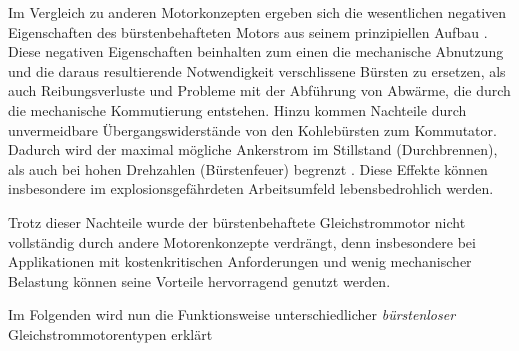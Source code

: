 \glqq{}Im  Vergleich  zu  anderen  Motorkonzepten  ergeben  sich  die  wesentlichen negativen Eigenschaften des bürstenbehafteten Motors aus seinem prinzipiellen Aufbau\grqq{} \parencite[S.52]{Probst2011}. Diese negativen Eigenschaften beinhalten zum einen die mechanische Abnutzung und die daraus resultierende Notwendigkeit verschlissene Bürsten zu ersetzen, als auch Reibungsverluste und Probleme mit der Abführung von Abwärme, die durch die mechanische Kommutierung entstehen. Hinzu kommen Nachteile durch unvermeidbare Übergangswiderstände von den Kohlebürsten zum Kommutator. Dadurch wird der maximal mögliche Ankerstrom im Stillstand (Durchbrennen), als auch bei hohen Drehzahlen (Bürstenfeuer) begrenzt \parencite[vgl.][S.52]{Probst2011}. Diese Effekte können insbesondere im explosionsgefährdeten Arbeitsumfeld lebensbedrohlich werden.

Trotz dieser Nachteile wurde der bürstenbehaftete Gleichstrommotor nicht vollständig durch andere Motorenkonzepte verdrängt, denn insbesondere bei Applikationen mit kostenkritischen Anforderungen und wenig mechanischer Belastung können seine Vorteile hervorragend genutzt werden.

Im Folgenden wird nun die Funktionsweise unterschiedlicher \emph{bürstenloser} Gleichstrommotorentypen erklärt

